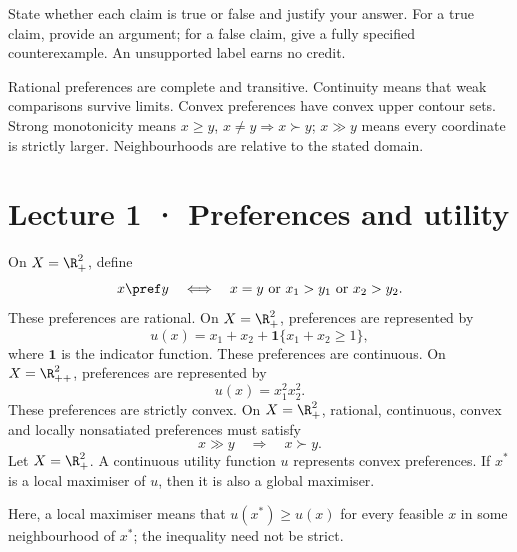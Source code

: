 State whether each claim is true or false and justify your answer. For a true claim, provide an argument; for a false claim, give a fully specified counterexample. An unsupported label earns no credit.

Rational preferences are complete and transitive. Continuity means that weak comparisons survive limits. Convex preferences have convex upper contour sets. Strong monotonicity means $x\ge y$, $x\ne y\Rightarrow x\succ y$; $x\gg y$ means every coordinate is strictly larger. Neighbourhoods are relative to the stated domain.
\section*{Lecture 1 · Preferences and utility}
On $X=\R_+^2$, define
\[
 x\pref y\quad\Longleftrightarrow\quad
 x=y\ \text{or}\ x_1>y_1\ \text{or}\ x_2>y_2.
\]
These preferences are rational.
On $X=\R_+^2$, preferences are represented by
\[
 u(x)=x_1+x_2+\mathbf1\{x_1+x_2\ge1\},
\]
where $\mathbf1$ is the indicator function. These preferences are continuous.
On $X=\R_{++}^2$, preferences are represented by
\[
 u(x)=x_1^2x_2^2.
\]
These preferences are strictly convex.
On $X=\R_+^2$, rational, continuous, convex and locally nonsatiated preferences must satisfy
\[
 x\gg y\quad\Rightarrow\quad x\succ y.
\]
Let $X=\R_+^2$. A continuous utility function $u$ represents convex preferences. If $x^*$ is a local maximiser of $u$, then it is also a global maximiser.

Here, a local maximiser means that $u(x^*)\ge u(x)$ for every feasible $x$ in some neighbourhood of $x^*$; the inequality need not be strict.
\clearpage
